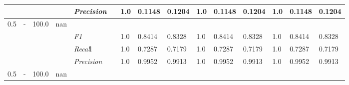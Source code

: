 \begin{table}[]
\begin{tabularx}{\textwidth}{XXlllllllllllll@{}}
                                                                    &                                                                     &                                                           &    & \textit{Precision} &                                                      & 1.0 & 0.1148 & 0.1204 & 1.0 & 0.1148 & 0.1204 & 1.0 & 0.1148 & 0.1204 \\ \midrule
0.5 & - & 100.0 & nan &                                                              &                                                                   &                                                             &                                                               &                                                                    &                                                              &                                                               &                                                                    &                                                              \\
                                                                    &                                                                     &                                                           &    & \textit{F1} &                                                      & 1.0        & 0.8414        & 0.8328        & 1.0        & 0.8414        & 0.8328        & 1.0        & 0.8414        & 0.8328        \\
                                                                    &                                                                     &                                                           &    & \textit{Recal}l &                                                      & 1.0    & 0.7287    & 0.7179    & 1.0    & 0.7287    & 0.7179    & 1.0    & 0.7287    & 0.7179    \\
                                                                    &                                                                     &                                                           &    & \textit{Precision} &                                                      & 1.0 & 0.9952 & 0.9913 & 1.0 & 0.9952 & 0.9913 & 1.0 & 0.9952 & 0.9913 \\ \midrule
0.5 & - & 100.0 & nan &                                                              &                                                                   &                                                             &                                                               &                                                                    &                                                              &                                                               &                                                                    &                                                              \\

\end{tabularx}
\end{table}

